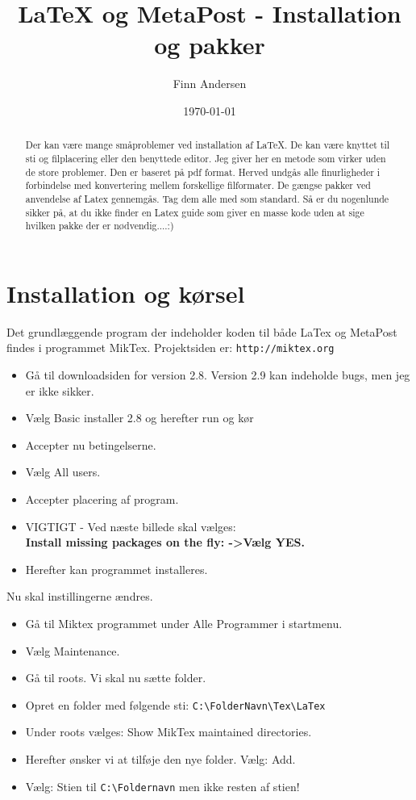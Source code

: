 \documentclass{article}
\begin{document}
\title{\LaTeX{} og MetaPost - Installation og pakker}

\author{Finn Andersen}
\date{\today}
\maketitle

\begin{abstract}
Der kan være mange småproblemer ved installation af \LaTeX{}. De kan være knyttet til sti og filplacering eller den benyttede editor. Jeg giver her en metode som virker uden de store problemer. Den er baseret på pdf format. Herved undgås alle finurligheder i forbindelse med konvertering mellem forskellige filformater. De gængse pakker ved anvendelse af Latex gennemgås. Tag dem alle med som standard. Så er du nogenlunde sikker på, at du ikke finder en Latex guide som giver en masse kode uden at sige hvilken pakke der er nødvendig....:)
\end{abstract}


\section{Installation og kørsel}

Det grundlæggende program der indeholder koden til både LaTex og MetaPost findes i programmet MikTex.
Projektsiden er: \verb"http://miktex.org"

\begin{itemize}
\item Gå til downloadsiden for version 2.8. Version 2.9 kan indeholde bugs, men jeg er ikke sikker.
\item Vælg Basic installer 2.8 og herefter run og kør 
\item Accepter nu betingelserne.
\item Vælg All users. 
\item Accepter placering af program.
\item VIGTIGT - Ved næste billede skal vælges:\\ \textbf{Install missing packages on the fly: ->Vælg YES.}
\item Herefter kan programmet installeres.
\end{itemize}

Nu skal instillingerne ændres.
\begin{itemize}
\item Gå til Miktex programmet under Alle Programmer i startmenu. 
\item Vælg Maintenance.
\item Gå til roots. Vi skal nu sætte folder.
\item Opret en folder med følgende sti: \verb"C:\FolderNavn\Tex\LaTex"
\item Under roots vælges: Show MikTex maintained directories.
\item Herefter ønsker vi at tilføje den nye folder.
Vælg: Add.
\item Vælg: Stien til \verb"C:\Foldernavn" men ikke resten af stien!
\end{itemize}
\end{document}
